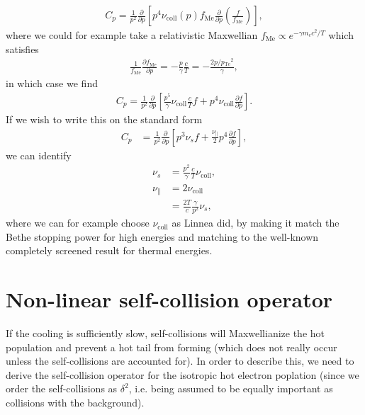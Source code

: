 \documentclass[11pt,a4paper]{article}
\newcommand{\sub}[1]{\ensuremath{_{\text{#1}}}}
\begin{document}
\begin{align}
C_p = \frac{1}{p^2}\frac{\partial}{\partial p} \left[ p^4 \nu\sub{coll}(p) f\sub{Me}\frac{\partial}{\partial p}\left(\frac{f}{f\sub{Me}}\right)\right],
\end{align}
where we could for example take a relativistic Maxwellian $f\sub{Me}\propto e^{-\gamma  m_e c^2/T}$ which satisfies 
\begin{align}
\frac{1}{f\sub{Me}}\frac{\partial f\sub{Me}}{\partial p} = -\frac{p}{\gamma}\frac{c}{T} = -\frac{2 p/p\sub{Te}^2}{\gamma}, 
\end{align}
in which case we find
\begin{align}
C_p = \frac{1}{p^2}\frac{\partial}{\partial p} \left[ \frac{p^5}{\gamma}\nu\sub{coll} \frac{c}{T} f  + p^4 \nu\sub{coll} \frac{\partial f}{\partial p}\right].
\end{align}
If we wish to write this on the standard form
\begin{align}
C_p &=\frac{1}{p^2}\frac{\partial}{\partial p} \left[ p^3\nu_s f + \frac{\nu_\parallel}{2}p^4\frac{\partial f}{\partial p}\right],
\end{align}
we can identify
\begin{align}
\nu_s &= \frac{p^2}{\gamma} \frac{c}{T}\nu\sub{coll}, \nonumber \\
\nu_\parallel &= 2\nu\sub{coll} \nonumber \\
&= \frac{2T}{c}\frac{\gamma}{p^2}\nu_s,
\end{align}
where we can for example choose $\nu\sub{coll}$ as Linnea did, by making it match the Bethe stopping power for high energies and matching to the well-known completely screened result for thermal energies.




\section{Non-linear self-collision operator}
If the cooling is sufficiently slow, self-collisions will Maxwellianize the hot population and prevent a hot tail from forming (which does not really occur unless the self-collisions are accounted for). In order to describe this, we need to derive the self-collision operator for the isotropic hot electron poplation (since we order the self-collisions as $\delta^2$, i.e. being assumed to be equally important as collisions with the background). 
\end{document}
